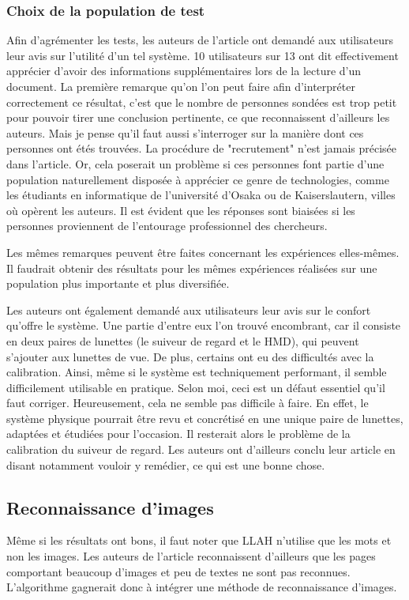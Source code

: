 \documentclass[a4paper]{article}
\begin{document}
\subsubsection{Choix de la population de test}
Afin d'agrémenter les tests, les auteurs de l'article ont demandé aux utilisateurs leur avis sur l'utilité d'un tel système. 10 utilisateurs sur 13 ont dit effectivement apprécier d'avoir des informations supplémentaires lors de la lecture d'un document. La première remarque qu'on l'on peut faire afin d'interpréter correctement ce résultat, c'est que le nombre de personnes sondées est trop petit pour pouvoir tirer une conclusion pertinente, ce que reconnaissent d'ailleurs les auteurs. Mais je pense qu'il faut aussi s'interroger sur la manière dont ces personnes ont étés trouvées. La procédure de "recrutement" n'est jamais précisée dans l'article. Or, cela poserait un problème si ces personnes font partie d'une population naturellement disposée à apprécier ce genre de technologies, comme les étudiants en informatique de l'université d'Osaka ou de Kaiserslautern, villes où opèrent les auteurs. Il est évident que les réponses sont biaisées si les personnes proviennent de l'entourage professionnel des chercheurs.

Les mêmes remarques peuvent être faites concernant les expériences elles-mêmes. Il faudrait obtenir des résultats pour les mêmes expériences réalisées sur une population plus importante et plus diversifiée.

Les auteurs ont également demandé aux utilisateurs leur avis sur le confort qu'offre le système. Une partie d'entre eux l'on trouvé encombrant, car il consiste en deux paires de lunettes (le suiveur de regard et le HMD), qui peuvent s'ajouter aux lunettes de vue. De plus, certains ont eu des difficultés avec la calibration. Ainsi, même si le système est techniquement performant, il semble difficilement utilisable en pratique. Selon moi, ceci est un défaut essentiel qu'il faut corriger. Heureusement, cela ne semble pas difficile à faire. En effet, le système physique pourrait être revu et concrétisé en une unique paire de lunettes, adaptées et étudiées pour l'occasion. Il resterait alors le problème de la calibration du suiveur de regard. Les auteurs ont d'ailleurs conclu leur article en disant notamment vouloir y remédier, ce qui est une bonne chose.

\subsection{Reconnaissance d'images}
Même si les résultats ont bons, il faut noter que LLAH n'utilise que les mots et non les images. Les auteurs de l'article reconnaissent d'ailleurs que les pages comportant beaucoup d'images et peu de textes ne sont pas reconnues. L'algorithme gagnerait donc à intégrer une méthode de reconnaissance d'images.
\end{document}
